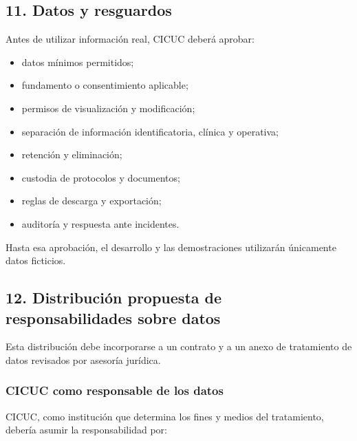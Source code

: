 \documentclass[
]{article}
\providecommand{\tightlist}{%
  \setlength{\itemsep}{0pt}\setlength{\parskip}{0pt}}
\begin{document}
\hypertarget{11-datos-y-resguardos}{%
\subsection{11. Datos y resguardos}\label{11-datos-y-resguardos}}

Antes de utilizar información real, CICUC deberá aprobar:

\begin{itemize}
\tightlist
\item
  datos mínimos permitidos;
\item
  fundamento o consentimiento aplicable;
\item
  permisos de visualización y modificación;
\item
  separación de información identificatoria, clínica y operativa;
\item
  retención y eliminación;
\item
  custodia de protocolos y documentos;
\item
  reglas de descarga y exportación;
\item
  auditoría y respuesta ante incidentes.
\end{itemize}

Hasta esa aprobación, el desarrollo y las demostraciones utilizarán
únicamente datos ficticios.

\hypertarget{12-distribuciuxf3n-propuesta-de-responsabilidades-sobre-datos}{%
\subsection{12. Distribución propuesta de responsabilidades sobre
datos}\label{12-distribuciuxf3n-propuesta-de-responsabilidades-sobre-datos}}

Esta distribución debe incorporarse a un contrato y a un anexo de
tratamiento de datos revisados por asesoría jurídica.

\hypertarget{cicuc-como-responsable-de-los-datos}{%
\subsubsection{CICUC como responsable de los
datos}\label{cicuc-como-responsable-de-los-datos}}

CICUC, como institución que determina los fines y medios del
tratamiento, debería asumir la responsabilidad por:
\end{document}
